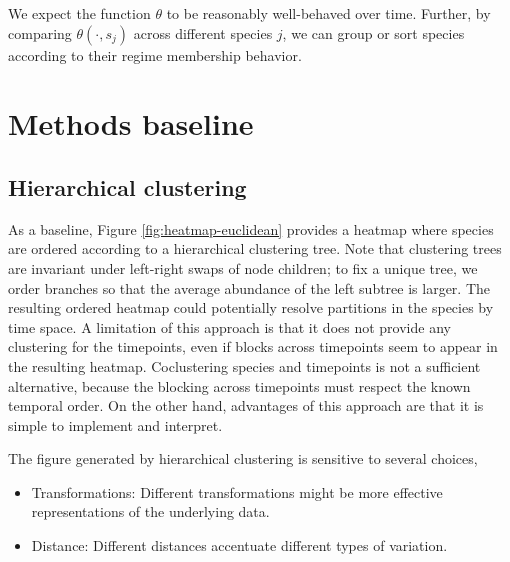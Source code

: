 \documentclass[14pt]{extreport}
\begin{document}
We expect the function $\theta$ to be reasonably well-behaved over time.
Further, by comparing $\theta\left(\cdot, s_{j}\right)$ across different species
$j$, we can group or sort species according to their regime membership behavior.

\section{Methods baseline}
\label{sec:baseline}

\subsection{Hierarchical clustering}

As a baseline, Figure \ref{fig:heatmap-euclidean} provides a heatmap where
species are ordered according to a hierarchical clustering tree. Note that
clustering trees are invariant under left-right swaps of node children; to fix a
unique tree, we order branches so that the average abundance of the left subtree
is larger. The resulting ordered heatmap could potentially resolve partitions in
the species by time space. A limitation of this approach is that it does not
provide any clustering for the timepoints, even if blocks across timepoints seem
to appear in the resulting heatmap. Coclustering species and timepoints is not a
sufficient alternative, because the blocking across timepoints must respect the
known temporal order. On the other hand, advantages of this approach are that it
is simple to implement and interpret.

The figure generated by hierarchical clustering is sensitive to several choices,
\begin{itemize}
\item Transformations: Different transformations might be more effective
  representations of the underlying data.
\item Distance: Different distances accentuate different types of variation.
\end{itemize}
\end{document}

